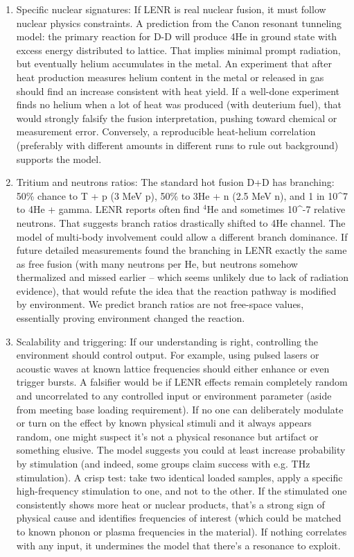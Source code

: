 \documentclass[11pt]{article}
\begin{document}
\begin{enumerate}

\item 
Specific nuclear signatures: If LENR is real nuclear fusion, it must follow nuclear physics constraints. A prediction from the Canon resonant tunneling model: the primary reaction for D-D will produce 4He in ground state with excess energy distributed to lattice. That implies minimal prompt radiation, but eventually helium accumulates in the metal. An experiment that after heat production measures helium content in the metal or released in gas should find an increase consistent with heat yield. If a well-done experiment finds no helium when a lot of heat was produced (with deuterium fuel), that would strongly falsify the fusion interpretation, pushing toward chemical or measurement error. Conversely, a reproducible heat-helium correlation (preferably with different amounts in different runs to rule out background) supports the model.




\item 
Tritium and neutrons ratios: The standard hot fusion D+D has branching: 50\% chance to T + p (3 MeV p), 50\% to 3He + n (2.5 MeV n), and 1 in 10^7 to 4He + gamma. LENR reports often find $^4$He and sometimes 10^-7 relative neutrons. That suggests branch ratios drastically shifted to 4He channel. The model of multi-body involvement could allow a different branch dominance. If future detailed measurements found the branching in LENR exactly the same as free fusion (with many neutrons per He, but neutrons somehow thermalized and missed earlier – which seems unlikely due to lack of radiation evidence), that would refute the idea that the reaction pathway is modified by environment. We predict branch ratios are not free-space values, essentially proving environment changed the reaction.




\item 
Scalability and triggering: If our understanding is right, controlling the environment should control output. For example, using pulsed lasers or acoustic waves at known lattice frequencies should either enhance or even trigger bursts. A falsifier would be if LENR effects remain completely random and uncorrelated to any controlled input or environment parameter (aside from meeting base loading requirement). If no one can deliberately modulate or turn on the effect by known physical stimuli and it always appears random, one might suspect it's not a physical resonance but artifact or something elusive. The model suggests you could at least increase probability by stimulation (and indeed, some groups claim success with e.g. THz stimulation). A crisp test: take two identical loaded samples, apply a specific high-frequency stimulation to one, and not to the other. If the stimulated one consistently shows more heat or nuclear products, that’s a strong sign of physical cause and identifies frequencies of interest (which could be matched to known phonon or plasma frequencies in the material). If nothing correlates with any input, it undermines the model that there's a resonance to exploit.





\end{enumerate}
\end{document}
